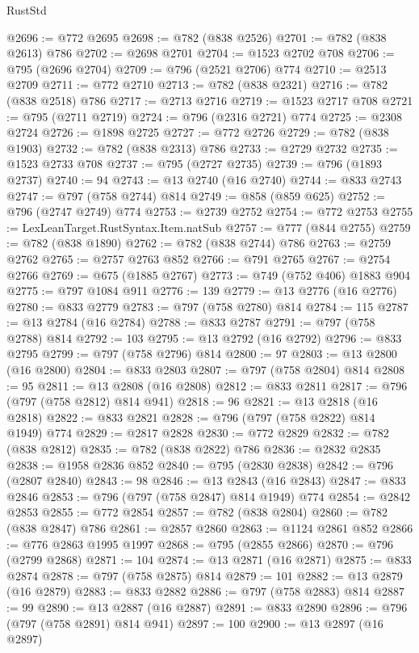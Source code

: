 \begin{lexlean}{RustStd}
\begin{coremodule}
{\begin{coremodule}
{{{{{{{{{{{{{{@2696 := @772 @2695
@2698 := @782 (@838 @2526)
@2701 := @782 (@838 @2613) @786
@2702 := @2698 @2701
@2704 := @1523 @2702 @708
@2706 := @795 (@2696 @2704)
@2709 := @796 (@2521 @2706) @774
@2710 := @2513 @2709
@2711 := @772 @2710
@2713 := @782 (@838 @2321)
@2716 := @782 (@838 @2518) @786
@2717 := @2713 @2716
@2719 := @1523 @2717 @708
@2721 := @795 (@2711 @2719)
@2724 := @796 (@2316 @2721) @774
@2725 := @2308 @2724
@2726 := @1898 @2725
@2727 := @772 @2726
@2729 := @782 (@838 @1903)
@2732 := @782 (@838 @2313) @786
@2733 := @2729 @2732
@2735 := @1523 @2733 @708
@2737 := @795 (@2727 @2735)
@2739 := @796 (@1893 @2737)
@2740 := 94
@2743 := @13 @2740 (@16 @2740)
@2744 := @833 @2743
@2747 := @797 (@758 @2744) @814
@2749 := @858 (@859 @625)
@2752 := @796 (@2747 @2749) @774
@2753 := @2739 @2752
@2754 := @772 @2753
@2755 := LexLeanTarget.RustSyntax.Item.natSub
@2757 := @777 (@844 @2755)
@2759 := @782 (@838 @1890)
@2762 := @782 (@838 @2744) @786
@2763 := @2759 @2762
@2765 := @2757 @2763 @852
@2766 := @791 @2765
@2767 := @2754 @2766
@2769 := @675 (@1885 @2767)
@2773 := @749 (@752 @406) @1883 @904
@2775 := @797 @1084 @911
@2776 := 139
@2779 := @13 @2776 (@16 @2776)
@2780 := @833 @2779
@2783 := @797 (@758 @2780) @814
@2784 := 115
@2787 := @13 @2784 (@16 @2784)
@2788 := @833 @2787
@2791 := @797 (@758 @2788) @814
@2792 := 103
@2795 := @13 @2792 (@16 @2792)
@2796 := @833 @2795
@2799 := @797 (@758 @2796) @814
@2800 := 97
@2803 := @13 @2800 (@16 @2800)
@2804 := @833 @2803
@2807 := @797 (@758 @2804) @814
@2808 := 95
@2811 := @13 @2808 (@16 @2808)
@2812 := @833 @2811
@2817 := @796 (@797 (@758 @2812) @814 @941)
@2818 := 96
@2821 := @13 @2818 (@16 @2818)
@2822 := @833 @2821
@2828 := @796 (@797 (@758 @2822) @814 @1949) @774
@2829 := @2817 @2828
@2830 := @772 @2829
@2832 := @782 (@838 @2812)
@2835 := @782 (@838 @2822) @786
@2836 := @2832 @2835
@2838 := @1958 @2836 @852
@2840 := @795 (@2830 @2838)
@2842 := @796 (@2807 @2840)
@2843 := 98
@2846 := @13 @2843 (@16 @2843)
@2847 := @833 @2846
@2853 := @796 (@797 (@758 @2847) @814 @1949) @774
@2854 := @2842 @2853
@2855 := @772 @2854
@2857 := @782 (@838 @2804)
@2860 := @782 (@838 @2847) @786
@2861 := @2857 @2860
@2863 := @1124 @2861 @852
@2866 := @776 @2863 @1995 @1997
@2868 := @795 (@2855 @2866)
@2870 := @796 (@2799 @2868)
@2871 := 104
@2874 := @13 @2871 (@16 @2871)
@2875 := @833 @2874
@2878 := @797 (@758 @2875) @814
@2879 := 101
@2882 := @13 @2879 (@16 @2879)
@2883 := @833 @2882
@2886 := @797 (@758 @2883) @814
@2887 := 99
@2890 := @13 @2887 (@16 @2887)
@2891 := @833 @2890
@2896 := @796 (@797 (@758 @2891) @814 @941)
@2897 := 100
@2900 := @13 @2897 (@16 @2897)
}}}}}}}}}}}}}}
\end{coremodule}}
\end{coremodule}
\end{lexlean}
